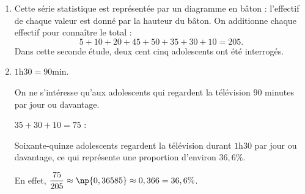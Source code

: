\documentclass[10pt,french]{article}
\begin{document}
\begin{enumerate}[label=\arabic*.]
    \item Cette série statistique est représentée par un diagramme en bâton : l'effectif de chaque valeur est donné par la hauteur du bâton. On additionne chaque effectif pour connaître le total :
        \[5 + 10 + 20 + 45 + 50 + 35 + 30 + 10 = 205.\]
        Dans cette seconde étude, deux cent cinq adolescents ont été interrogés.
    \item %
$1\text{h}30 = 90\text{min}$.\par
        On ne s'intéresse qu'aux adolescents qui regardent la télévision $90$ minutes par jour ou davantage.\par
        $35 + 30 + 10 = 75$ :\par
        Soixante-quinze adolescents regardent la télévision durant $1\text{h}30$ par jour ou davantage, ce qui représente une proportion d'environ $36,6\%$.\par
        En effet, $\dfrac{75}{205} \approx \np{0,36585} \approx 0,366 = 36,6\%$.
\end{enumerate}

\end{document}
